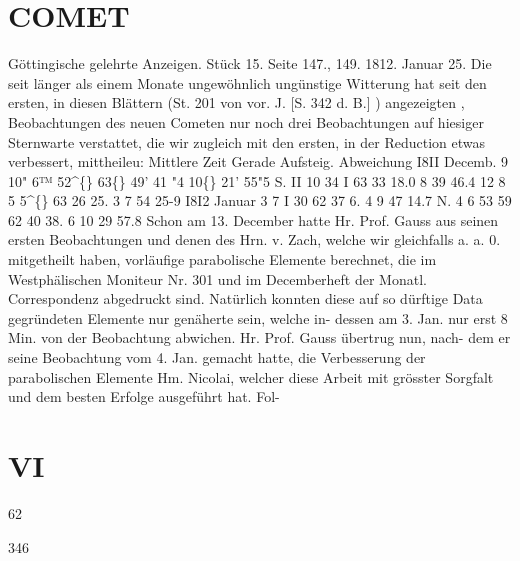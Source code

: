 \documentclass[12pt,a4paper]{article}
\newcommand{\degree}{\textdegree}
\begin{document}
\section*{COMET}
Göttingische  gelehrte  Anzeigen.  Stück  15.  Seite  147.,  149.     1812.  Januar  25. 
Die  seit  länger  als  einem  Monate  ungewöhnlich  ungünstige  Witterung  hat  seit  den  ersten,  in 
diesen  Blättern  (St.  201  von  vor.  J.  [S.  342  d.  B.] )  angezeigten ,  Beobachtungen  des  neuen  Cometen  nur 
noch  drei  Beobachtungen  auf  hiesiger  Sternwarte  verstattet,  die  wir  zugleich  mit  den  ersten,  in  der 
Reduction  etwas  verbessert,  mittheileu: 
Mittlere  Zeit Gerade  Aufsteig. 
Abweichung 
I8II Decemb.  9 
10"    6™  52\textasciicircum\{\} 
63\degree\{\}  49'  41 "4 
10\degree\{\}  21'  55"5  S. 
II 
10    34      I 
63    33    18.0 
8    39    46.4 
12 
8      5     5\textasciicircum\{\} 
63    26    25. 3 
7    54    25-9 
I8I2 Januar     3 
7       I     30 
62    37      6. 4 
9    47     14.7  N. 
4 
6     53     59 
62    40    38. 6 
10    29    57.8 
Schon  am  13.  December  hatte  Hr.  Prof.  Gauss  aus  seinen  ersten  Beobachtungen  und  denen  des  Hrn. 
v.  Zach,  welche  wir  gleichfalls  a.  a.  0.  mitgetheilt  haben,  vorläufige  parabolische  Elemente  berechnet, 
die  im  Westphälischen  Moniteur  Nr.  301  und  im  Decemberheft  der  Monatl.  Correspondenz  abgedruckt 
sind.  Natürlich  konnten  diese  auf  so  dürftige  Data  gegründeten  Elemente  nur  genäherte  sein,  welche  in- 
dessen am  3.  Jan.  nur  erst  8  Min.  von  der  Beobachtung  abwichen.  Hr.  Prof.  Gauss  übertrug  nun,  nach- 
dem er  seine  Beobachtung  vom  4.  Jan.  gemacht  hatte,  die  Verbesserung  der  parabolischen  Elemente 
Hm.  Nicolai,  welcher  diese  Arbeit  mit  grösster  Sorgfalt  und  dem  besten  Erfolge  ausgeführt  hat.    Fol- 

\section*{VI}
62 


\newpage
346 
\end{document}
